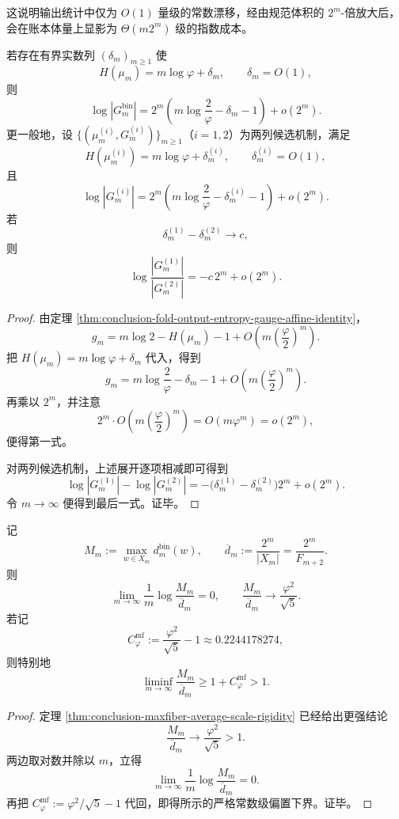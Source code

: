 \noindent
这说明输出统计中仅为 \(O(1)\) 量级的常数漂移，经由规范体积的 \(2^m\)-倍放大后，会在账本体量上显影为 \(\Theta(m2^m)\) 级的指数成本。

\begin{corollary}\label{cor:conclusion-entropy-constant-gauge-superexponential-amplification}
若存在有界实数列 \((\delta_m)_{m\ge 1}\) 使
\[
H(\mu_m)=m\log\varphi+\delta_m,
\qquad
\delta_m=O(1),
\]
则
\[
\log|G_m^{\mathrm{bin}}|
=
2^m\left(
m\log\frac{2}{\varphi}-\delta_m-1
\right)
+o(2^m).
\]
更一般地，设 \(\{(\mu_m^{(i)},G_m^{(i)})\}_{m\ge 1}\)（\(i=1,2\)）为两列候选机制，满足
\[
H(\mu_m^{(i)})=m\log\varphi+\delta_m^{(i)},
\qquad
\delta_m^{(i)}=O(1),
\]
且
\[
\log|G_m^{(i)}|
=
2^m\left(
m\log\frac{2}{\varphi}-\delta_m^{(i)}-1
\right)
+o(2^m).
\]
若
\[
\delta_m^{(1)}-\delta_m^{(2)}\to c,
\]
则
\[
\log\frac{|G_m^{(1)}|}{|G_m^{(2)}|}
=
-c\,2^m+o(2^m).
\]
\end{corollary}
\begin{proof}
由定理 \ref{thm:conclusion-fold-output-entropy-gauge-affine-identity}，
\[
g_m
=
m\log 2-H(\mu_m)-1
+O\!\left(m\left(\frac{\varphi}{2}\right)^m\right).
\]
把
\(
H(\mu_m)=m\log\varphi+\delta_m
\)
代入，得到
\[
g_m
=
m\log\frac{2}{\varphi}-\delta_m-1
+O\!\left(m\left(\frac{\varphi}{2}\right)^m\right).
\]
再乘以 \(2^m\)，并注意
\[
2^m\cdot O\!\left(m\left(\frac{\varphi}{2}\right)^m\right)
=
O(m\varphi^m)
=
o(2^m),
\]
便得第一式。

对两列候选机制，上述展开逐项相减即可得到
\[
\log|G_m^{(1)}|-\log|G_m^{(2)}|
=
-\bigl(\delta_m^{(1)}-\delta_m^{(2)}\bigr)2^m+o(2^m).
\]
令 \(m\to\infty\) 便得到最后一式。证毕。
\end{proof}

\begin{theorem}[最大纤维的非凝聚律]\label{thm:conclusion-maxfiber-noncondensation-law}
记
\[
M_m:=\max_{w\in X_m}d_m^{\mathrm{bin}}(w),
\qquad
\overline d_m:=\frac{2^m}{|X_m|}=\frac{2^m}{F_{m+2}}.
\]
则
\[
\lim_{m\to\infty}\frac1m\log\frac{M_m}{\overline d_m}=0,
\qquad
\frac{M_m}{\overline d_m}\longrightarrow \frac{\varphi^2}{\sqrt5}.
\]
若记
\[
C_\varphi^{\mathrm{mf}}:=\frac{\varphi^2}{\sqrt5}-1\approx 0.2244178274,
\]
则特别地
\[
\liminf_{m\to\infty}\frac{M_m}{\overline d_m}
\ge
1+C_\varphi^{\mathrm{mf}}>1.
\]
\end{theorem}
\begin{proof}
定理 \ref{thm:conclusion-maxfiber-average-scale-rigidity} 已经给出更强结论
\[
\frac{M_m}{\overline d_m}\longrightarrow \frac{\varphi^2}{\sqrt5}>1.
\]
两边取对数并除以 \(m\)，立得
\[
\lim_{m\to\infty}\frac1m\log\frac{M_m}{\overline d_m}=0.
\]
再把
\(
C_\varphi^{\mathrm{mf}}:=\varphi^2/\sqrt5-1
\)
代回，即得所示的严格常数级偏置下界。证毕。
\end{proof}

